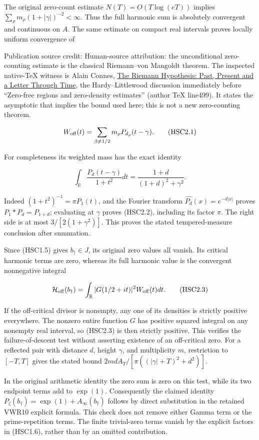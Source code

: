 The original zero-count estimate \(N(T)=O(T\log(eT))\) implies
\(\sum_\rho m_\rho(1+|\gamma|)^{-2}<\infty\). Thus the full harmonic sum
is absolutely convergent and continuous on \(A\). The same estimate on
compact real intervals proves locally uniform convergence of

Publication source credit: Human-source attribution: the unconditional
zero-counting estimate is the classical Riemann--von Mangoldt theorem.
The inspected native-TeX witness is Alain Connes,
\href{https://arxiv.org/abs/2602.04022v1}{The Riemann Hypothesis: Past,
Present and a Letter Through Time}, the Hardy--Littlewood discussion
immediately before ``Zero-free regions and zero-density estimates''
(author TeX line499). It states the asymptotic that implies the bound
used here; this is not a new zero-counting theorem.

\[
 W_{\rm off}(t)=\sum_{\beta\ne1/2}m_\rho P_{d_\rho}(t-\gamma).
\tag{HSC2.1}
\]

For completeness its weighted mass has the exact identity

\[
 \int_{\mathbb R}\frac{P_d(t-\gamma)}{1+t^2}dt
 =\frac{1+d}{(1+d)^2+\gamma^2}.
\tag{HSC2.2}
\]

Indeed \((1+t^2)^{-1}=\pi P_1(t)\), and the Fourier transform
\(\widehat{P_d}(x)=e^{-d|x|}\) proves \(P_1*P_d=P_{1+d}\); evaluating at
\(\gamma\) proves (HSC2.2), including its factor \(\pi\). The right side
is at most \(3/[2(1+\gamma^2)]\). This proves the stated
tempered-measure conclusion after summation.

Since (HSC1.5) gives \(b_\dagger\in J\), its original zero values all
vanish. Its critical harmonic terms are zero, whereas its full harmonic
value is the convergent nonnegative integral

\[
 \mathcal H_{\rm off}(b_\dagger)
 =\int_{\mathbb R}|G(1/2+it)|^2W_{\rm off}(t)dt.
\tag{HSC2.3}
\]

If the off-critical divisor is nonempty, any one of its densities is
strictly positive everywhere. The nonzero entire function \(G\) has
positive squared integral on any nonempty real interval, so (HSC2.3) is
then strictly positive. This verifies the failure-of-descent test
without asserting existence of an off-critical zero. For a reflected
pair with distance \(d\), height \(\gamma\), and multiplicity \(m\),
restriction to \([-T,T]\) gives the stated bound
\(2md A_T/[\pi((|\gamma|+T)^2+d^2)]\).

In the original arithmetic identity the zero sum is zero on this test,
while its two endpoint terms add to \(\exp(1)\). Consequently the
claimed identity \(P_\zeta(b_\dagger)=\exp(1)+A_\infty(b_\dagger)\)
follows by direct substitution in the retained VWR10 explicit formula.
This check does not remove either Gamma term or the prime-repetition
terms. The finite trivial-zero terms vanish by the explicit factors in
(HSC1.6), rather than by an omitted contribution.

